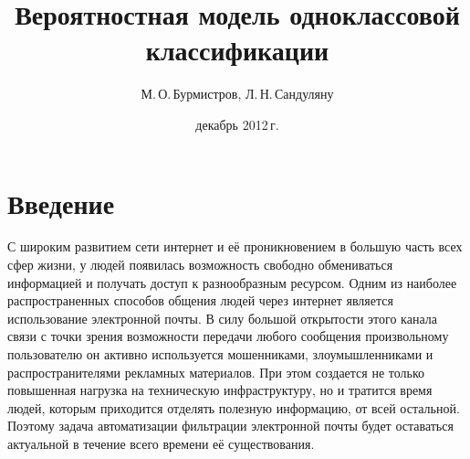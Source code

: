 \documentclass[12pt,a4paper]{article}
\begin{document}

	\title{Вероятностная модель одноклассовой классификации}
	\author{М.\,О.\,Бурмистров, Л.\,Н.\,Сандуляну}
	\date{декабрь 2012\,г.}


\maketitle
\section{Введение} 							
	С широким развитием сети интернет и её проникновением в большую часть всех сфер жизни, у людей появилась возможность свободно обмениваться информацией и получать доступ к разнообразным ресурсом. 
	Одним из наиболее распространенных способов общения людей через интернет является использование электронной почты. 
	В силу большой открытости этого канала связи с точки зрения возможности передачи любого сообщения произвольному пользователю он активно используется мошенниками, злоумышленниками и распространителями рекламных материалов. При этом создается не только повышенная нагрузка на техническую инфраструктуру, но и тратится время людей, которым приходится отделять полезную информацию, от всей остальной. 
	Поэтому задача автоматизации фильтрации электронной почты будет оставаться актуальной в течение всего времени её существования.
\end{document}
